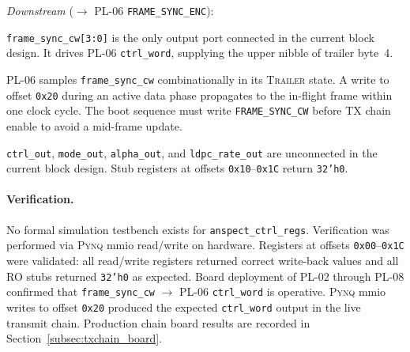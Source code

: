 \textit{Downstream} ($\rightarrow$ PL-06 \texttt{FRAME\_SYNC\_ENC}):
\begin{tightemize}
  \item \texttt{frame\_sync\_cw[3:0]} is the only output port
        connected in the current block design. It drives PL-06
        \texttt{ctrl\_word}, supplying the upper nibble of trailer
        byte~4.
  \item PL-06 samples \texttt{frame\_sync\_cw} combinationally in
        its \textsc{Trailer} state.
        A write to offset \texttt{0x20} during an active data phase
        propagates to the in-flight frame within one clock cycle.
        The boot sequence must write \texttt{FRAME\_SYNC\_CW} before
        TX chain enable to avoid a mid-frame update.
  \item \texttt{ctrl\_out}, \texttt{mode\_out}, \texttt{alpha\_out},
        and \texttt{ldpc\_rate\_out} are unconnected in the current
        block design.
        Stub registers at offsets \texttt{0x10}–\texttt{0x1C} return
        \texttt{32'h0}.
\end{tightemize}


\FloatBarrier
\paragraph{Verification.}

No formal simulation testbench exists for \texttt{anspect\_ctrl\_regs}.
Verification was performed via \textsc{Pynq} \ac{mmio} read/write on
hardware.
Registers at offsets \texttt{0x00}–\texttt{0x1C} were validated: all
read/write registers returned correct write-back values and all RO
stubs returned \texttt{32'h0} as expected.
Board deployment of PL-02 through PL-08 confirmed that
\texttt{frame\_sync\_cw} $\rightarrow$ PL-06 \texttt{ctrl\_word}
is operative.
\textsc{Pynq} \ac{mmio} writes to offset \texttt{0x20} produced the
expected \texttt{ctrl\_word} output in the live transmit chain.
Production chain board results are recorded in
Section~\ref{subsec:txchain_board}.


\clearpage  

